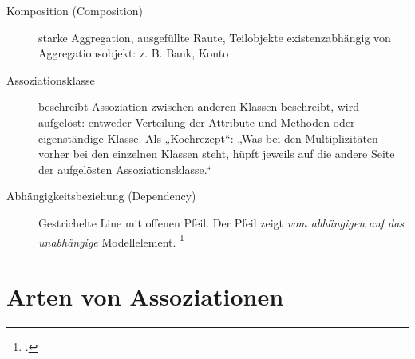 \documentclass{lehramt-informatik-haupt}
\begin{document}
\begin{description}
%

\item[Komposition (Composition)]
starke Aggregation, ausgefüllte Raute, Teilobjekte existenzabhängig von
Aggregationsobjekt: z. B. Bank, Konto


\item[Assoziationsklasse]
beschreibt Assoziation zwischen anderen Klassen beschreibt, wird
aufgelöst: entweder Verteilung der Attribute und Methoden oder
eigenständige Klasse. Als „Kochrezept“: „Was bei den Multiplizitäten
vorher bei den einzelnen Klassen steht, hüpft jeweils auf die andere
Seite der aufgelösten Assoziationsklasse.“

\item[Abhängigkeitsbeziehung (Dependency)]

Gestrichelte Line mit offenen Pfeil. Der Pfeil zeigt \emph{vom
abhängigen auf das unabhängige} Modellelement. 
\footcite[Kapitel 6.4.10 Abhängigkeitsbeziehung, Seite 159]{rupp}

\end{description}

%

\section{Arten von Assoziationen}
\end{document}

